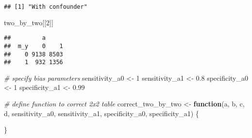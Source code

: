 \documentclass[
]{book}
\newenvironment{Shaded}{\begin{snugshade}}{\end{snugshade}}
\newcommand{\CommentTok}[1]{\textcolor[rgb]{0.56,0.35,0.01}{\textit{#1}}}
\newcommand{\ControlFlowTok}[1]{\textcolor[rgb]{0.13,0.29,0.53}{\textbf{#1}}}
\newcommand{\DecValTok}[1]{\textcolor[rgb]{0.00,0.00,0.81}{#1}}
\newcommand{\FloatTok}[1]{\textcolor[rgb]{0.00,0.00,0.81}{#1}}
\newcommand{\NormalTok}[1]{#1}
\newcommand{\OtherTok}[1]{\textcolor[rgb]{0.56,0.35,0.01}{#1}}
\begin{document}
\begin{verbatim}
## [1] "With confounder"
\end{verbatim}

\begin{Shaded}
\begin{Highlighting}[]
\NormalTok{two\_by\_two[[}\DecValTok{2}\NormalTok{]] }
\end{Highlighting}
\end{Shaded}

\begin{verbatim}
##         a     
##  m_y    0    1
##    0 9138 8503
##    1  932 1356
\end{verbatim}

\begin{Shaded}
\begin{Highlighting}[]
\CommentTok{\# specify bias parameters}
\NormalTok{sensitivity\_a0 }\OtherTok{\textless{}{-}}  \DecValTok{1}
\NormalTok{sensitivity\_a1 }\OtherTok{\textless{}{-}} \FloatTok{0.8}
\NormalTok{specificity\_a0 }\OtherTok{\textless{}{-}} \DecValTok{1}
\NormalTok{specificity\_a1 }\OtherTok{\textless{}{-}} \FloatTok{0.99}

\CommentTok{\# define function to correct 2x2 table}
\NormalTok{correct\_two\_by\_two }\OtherTok{\textless{}{-}} \ControlFlowTok{function}\NormalTok{(a, b, c, d, sensitivity\_a0, sensitivity\_a1, specificity\_a0, specificity\_a1) \{}
  
\NormalTok{\}}


\end{Highlighting}
\end{Shaded}
\end{document}
